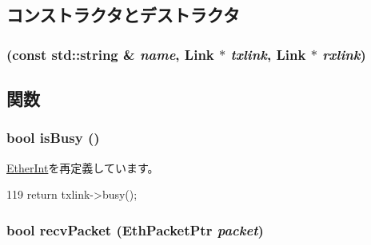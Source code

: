 \subsection{コンストラクタとデストラクタ}
\hypertarget{classEtherLink_1_1Interface_ac65fdcafd3edde87ea220afaf9ab4fee}{
\subsubsection[{Interface}]{ (const std::string \& {\em name}, \/  {\bf Link} $\ast$ {\em txlink}, \/  {\bf Link} $\ast$ {\em rxlink})}}
\label{classEtherLink_1_1Interface_ac65fdcafd3edde87ea220afaf9ab4fee}


\subsection{関数}
\hypertarget{classEtherLink_1_1Interface_a108b650255e1fff7409a075681e6f46b}{
\subsubsection[{isBusy}]{\setlength{\rightskip}{0pt plus 5cm}bool isBusy ()}}
\label{classEtherLink_1_1Interface_a108b650255e1fff7409a075681e6f46b}


\hyperlink{classEtherInt_ae11cd8f177ca41a395ea873754cb5f9b}{EtherInt}を再定義しています。


\begin{DoxyCode}
119 { return txlink->busy(); }
\end{DoxyCode}
\hypertarget{classEtherLink_1_1Interface_ad54e71348f53dfb5444979e9bfaf3164}{
\subsubsection[{recvPacket}]{\setlength{\rightskip}{0pt plus 5cm}bool recvPacket ({\bf EthPacketPtr} {\em packet})}}
\label{classEtherLink_1_1Interface_ad54e71348f53dfb5444979e9bfaf3164}


